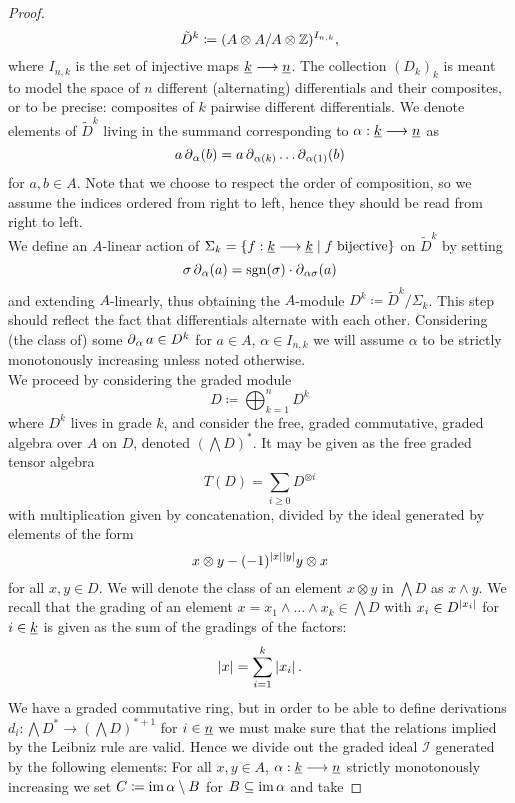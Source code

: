 \begin{prop}
\begin{proof}
$$\tilde{D}^k \coloneqq (A \otimes A / A \otimes \mathbb{Z}) ^ { I_{n,k} },$$
where $I_{n,k}$ is the set of injective maps $\underline{k} \longrightarrow \underline{n}$. The collection $(D_k)_k$ is meant to model the space of $n$ different (alternating) differentials and their composites, or to be precise: composites of $k$ pairwise different differentials. We denote elements of $\tilde{D}^k$ living in the summand corresponding to $\alpha: \underline{k} \longrightarrow \underline{n}$ as
\[a \operatorname{\partial}_\alpha (b) = a \operatorname{\partial}_{\alpha(k)} \ldots \operatorname{\partial}_{\alpha(1)} (b)\]%
for $a,b \in A$. Note that we choose to respect the order of composition, so we assume the indices ordered from right to left, hence they should be read from right to left.\\%
We define an $A$-linear action of $\Sigma_k = \{f: \underline{k} \longrightarrow \underline{k} \mid f \; \mathrm{bijective} \}$ on $\tilde{D}^k$ by setting%
$$\sigma \operatorname{\partial}_\alpha (a) = \operatorname{sgn}(\sigma) \cdot \operatorname{\partial}_{\alpha \sigma} (a)$$
and extending $A$-linearly, thus obtaining the $A$-module $D^k \coloneqq \tilde{D}^k/\Sigma_k$. This step should reflect the fact that differentials alternate with each other. Considering (the class of) some $\operatorname{\partial}_\alpha a \in D^k$ for $a \in A$, $\alpha \in I_{n,k}$ we will assume $\alpha$ to be strictly monotonously increasing unless noted otherwise.\\
We proceed by considering the graded module
\begin{equation*}
D \coloneqq \bigoplus_{k=1}^{n} D^k
\end{equation*}
where $D^k$ lives in grade $k$, and consider the free, graded commutative, graded algebra over $A$ on $D$, denoted $(\bigwedge D)^*$. It may be given as the free graded tensor algebra
\begin{equation*}
  T (D) = \sum_{i \geq 0} D^{\otimes i}
\end{equation*}
with multiplication given by concatenation, divided by the ideal generated by elements of the form
\begin{equation*}
  x \otimes y - (-1)^{\left\vert x\right\vert\left\vert y\right\vert} y \otimes x
\end{equation*}
for all $x,y \in D$. We will denote the class of an element $x \otimes y$ in $\bigwedge D$ as $x \wedge y$. We recall that the grading of an element $x = x_1 \wedge \ldots \wedge x_k \in \bigwedge D$ with $x_i \in D^{\left\vert x_i\right\vert}$ for $i \in \underline{k}$ is given as the sum of the gradings of the factors:
\begin{equation*}
  \left\vert x\right\vert = \sum_{i=1}^k \left\vert x_i\right\vert.
\end{equation*}
We have a graded commutative ring, but in order to be able to define derivations $d_i: \bigwedge D ^* \to (\bigwedge D)^{*+1}$ for $i \in \underline{n}$ we must make sure that the relations implied by the Leibniz rule are valid. Hence we divide out the graded ideal $\mathcal{I}$ generated by the following elements: For all $x,y \in A$, $\alpha: \underline{k} \longrightarrow \underline{n}$ strictly monotonously increasing we set $C \coloneqq \operatorname{im} \alpha \setminus B$ for $B \subseteq \operatorname{im} \alpha$ and take

\end{proof}
\end{prop}
